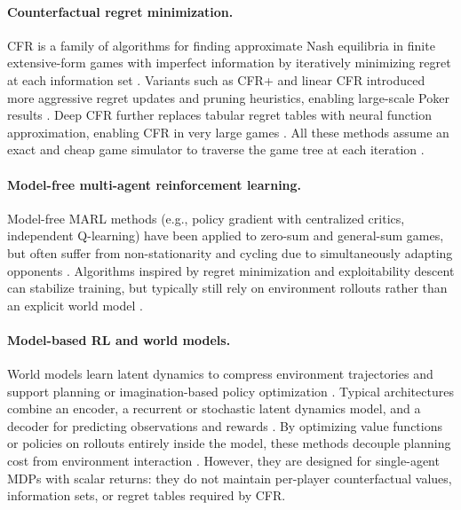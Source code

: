\documentclass{article}
\begin{document}
\paragraph{Counterfactual regret minimization.}
CFR is a family of algorithms for finding approximate Nash equilibria in finite extensive-form games with imperfect information by iteratively minimizing regret at each information set \citep{zinkevich2008regret}. Variants such as CFR+ and linear CFR introduced more aggressive regret updates and pruning heuristics, enabling large-scale Poker results \citep{tammelin2015solving,brown2019superhuman}. Deep CFR further replaces tabular regret tables with neural function approximation, enabling CFR in very large games \citep{brown2019deepcfr}. All these methods assume an exact and cheap game simulator to traverse the game tree at each iteration \cite{lanctot2017openspiel}.

\paragraph{Model-free multi-agent reinforcement learning.}
Model-free MARL methods (e.g., policy gradient with centralized critics, independent Q-learning) have been applied to zero-sum and general-sum games, but often suffer from non-stationarity and cycling due to simultaneously adapting opponents \cite{heinrich2016deep,foerster2018counterfactual}. Algorithms inspired by regret minimization and exploitability descent can stabilize training, but typically still rely on environment rollouts rather than an explicit world model \cite{perolat2022mastering,srinivasan2018actor}.

\paragraph{Model-based RL and world models.}
World models learn latent dynamics to compress environment trajectories and support planning or imagination-based policy optimization \cite{ha2018worldmodels}. Typical architectures combine an encoder, a recurrent or stochastic latent dynamics model, and a decoder for predicting observations and rewards \cite{kaiser2019model}. By optimizing value functions or policies on rollouts entirely inside the model, these methods decouple planning cost from environment interaction \cite{hafner2019dreamer,micheli2023transformers}. However, they are designed for single-agent MDPs with scalar returns: they do not maintain per-player counterfactual values, information sets, or regret tables required by CFR.
\end{document}
